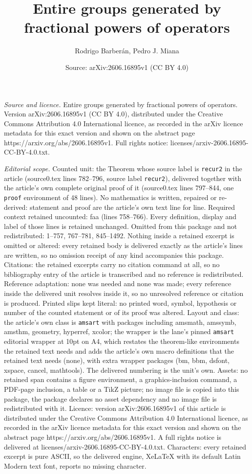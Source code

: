 \documentclass[10pt,a4paper]{amsart}
\title[Entire groups generated by fractional powers of operators]{Entire groups generated by fractional powers of operators}
\author{Rodrigo Barber\'an, Pedro J. Miana}
\date{Source: arXiv:2606.16895v1 (CC BY 4.0)}
\begin{document}
\maketitle

\noindent\emph{Source and licence.} Entire groups generated by fractional powers of operators. Version arXiv:2606.16895v1 (CC BY 4.0), distributed under the Creative Commons Attribution 4.0 International licence, as recorded in the arXiv licence metadata for this exact version and shown on the abstract page https://arxiv.org/abs/2606.16895v1. Full rights notice: licenses/arxiv-2606.16895-CC-BY-4.0.txt.\par\smallskip

\noindent\textit{Editorial scope.} Counted unit: the Theorem whose source label is \texttt{recur2} in the article (source0.tex lines 782--796, source label \texttt{recur2}), delivered together with the article's own complete original proof of it (source0.tex lines 797--844, one \texttt{proof} environment of 48 lines). No mathematics is written, repaired or re-derived: statement and proof are the article's own text line for line. Required context retained uncounted: faa (lines 758--766). Every definition, display and label of those lines is retained unchanged. Omitted from this package and not redistributed: 1--757, 767--781, 845--1492. Nothing inside a retained excerpt is omitted or altered: every retained body is delivered exactly as the article's lines are written, so no omission receipt of any kind accompanies this package. Citations: the retained excerpts carry no citation command at all, so no bibliography entry of the article is transcribed and no reference is redistributed. Reference adaptation: none was needed and none was made; every reference inside the delivered unit resolves inside it, so no unresolved reference or citation is produced. Printed slips kept literal: no printed word, symbol, hypothesis or number of the counted statement or of its proof was altered. Layout and class: the article's own class is \texttt{amsart} with packages including amsmath, amssymb, amsthm, geometry, hyperref, xcolor; the wrapper is the lane's pinned \texttt{amsart} editorial wrapper at 10pt on A4, which restates the theorem-like environments the retained text needs and adds the article's own macro definitions that the retained text needs (none), with extra wrapper packages (bm, bbm, dsfont, xspace, cancel, mathtools). The delivered numbering is the unit's own. Assets: no retained span contains a figure environment, a graphics-inclusion command, a PDF-page inclusion, a table or a TikZ picture; no image file is copied into this package, the package declares no asset dependency and no image file is redistributed with it. Licence: version arXiv:2606.16895v1 of this article is distributed under the Creative Commons Attribution 4.0 International licence, as recorded in the arXiv licence metadata for this exact version and shown on the abstract page https://arxiv.org/abs/2606.16895v1. A full rights notice is delivered at licenses/arxiv-2606.16895-CC-BY-4.0.txt. Characters: every retained excerpt is pure ASCII, so the delivered engine, XeLaTeX with its default Latin Modern text font, reports no missing character.
\end{document}
